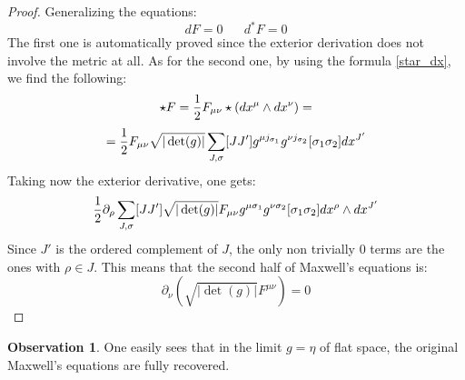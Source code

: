 \documentclass[12pt,a4paper]{report}
\theoremstyle{definition}
\theoremstyle{Theorem}
\theoremstyle{definition}
\theoremstyle{definition}
\newtheorem{Obs}[Def]{Observation}
\begin{document}
	\begin{proof}
		Generalizing the equations: 
		$$dF=0\hspace{20pt} d^*F=0$$
		The first one is automatically proved since the exterior derivation does not involve the metric at all. As for the second one, by using the formula \ref{star_dx}, we find the following:
		$$\star F={1\over 2} F_{\mu\nu}\star( dx^\mu\wedge dx^\nu)=$$
		$$={1\over 2}F_{\mu\nu}\sqrt{|\det(g)|}\sum_{J,\sigma}[JJ']g^{\mu j_{\sigma_1}}g^{\nu j_{\sigma_2}}[\sigma_1\sigma_2] dx^{J'}$$
		Taking now the exterior derivative, one	gets:
		$${1\over 2}\partial_\rho \sum_{J,\sigma} [JJ']\sqrt{|\det(g)|}F_{\mu\nu}g^{\mu \sigma_1}g^{\nu \sigma_2}[\sigma_1\sigma_2] dx^\rho\wedge dx^{J'}$$ 
		Since $J'$ is the ordered complement of $J$, the only non trivially 0 terms are the ones with $\rho \in J$. This means that the second half of Maxwell's equations is:
		$$\partial_\nu (\sqrt{|\det(g)|}F^{\mu\nu})=0$$
	\end{proof}
	\begin{Obs}
		One easily sees that in the limit $g=\eta$ of flat space, the original Maxwell's equations are fully recovered.
	\end{Obs}
\end{document}
